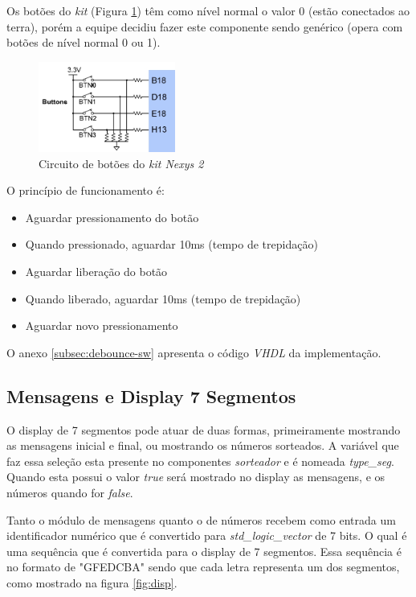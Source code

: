 \documentclass[12pt]{article}
\begin{document}
Os botões do \emph{kit} (Figura \ref{fig:nexys2_bots}) têm como nível normal o valor 0 (estão conectados ao terra), porém a equipe decidiu fazer este componente sendo genérico (opera com botões de nível normal 0 ou 1).

\begin{figure}[!ht]
    \centering
    \includegraphics[width=0.4\textwidth]{img/nexys2_bots.jpg}
    \caption{Circuito de botões do \emph{kit Nexys 2}}
    \label{fig:nexys2_bots}
\end{figure}

O princípio de funcionamento é:
\begin{itemize}
    \item Aguardar pressionamento do botão
    \item Quando pressionado, aguardar 10ms (tempo de trepidação)
    \item Aguardar liberação do botão
    \item Quando liberado, aguardar 10ms (tempo de trepidação)
    \item Aguardar novo pressionamento
\end{itemize}

O anexo \ref{subsec:debounce-sw} apresenta o código \emph{VHDL} da implementação.


\subsection{Mensagens e Display 7 Segmentos}
O display de 7 segmentos pode atuar de duas formas, primeiramente mostrando as mensagens inicial e final, ou mostrando os números sorteados. A variável que faz essa seleção esta presente no componentes \textit{sorteador} e é nomeada \textit{type\_seg}. Quando esta possui o valor \textit{true} será mostrado no display as mensagens, e os números quando for \textit{false}.

Tanto o módulo de mensagens quanto o de números recebem como entrada um identificador numérico que é convertido para \textit{std\_logic\_vector} de 7 bits. O qual é uma sequência que é convertida para o display de 7 segmentos. Essa sequência é no formato de "GFEDCBA" sendo que cada letra representa um dos segmentos, como mostrado na figura \ref{fig:disp}.
\end{document}
